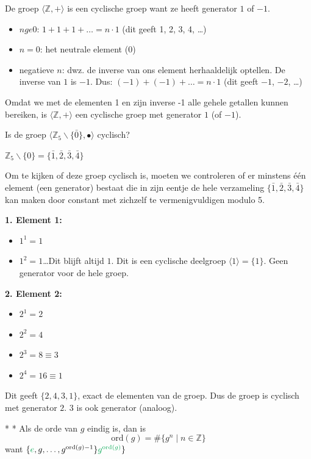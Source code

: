 \textbf{} De groep $\langle \mathbb{Z},+ \rangle$ is een cyclische groep want ze heeft generator $1$ of $-1$.
\begin{itemize}
    \item $n ge 0$: $1+1+1+ \dots = n \cdot 1$ (dit geeft 1, 2, 3, 4, \dots)
    \item $n=0$: het neutrale element (0)
    \item negatieve $n$: dwz. de inverse van ons element herhaaldelijk optellen. De inverse van $1$ is $-1$. Dus: $(-1) + (-1) + \dots = n \cdot 1$ (dit geeft $-1$, $-2$, \dots)
\end{itemize}
Omdat we met de elementen 1 en zijn inverse -1 alle gehele getallen kunnen bereiken, is $\langle \mathbb{Z},+ \rangle$ een cyclische groep met generator $1$ (of $-1$).

\begin{niceexercise}
    Is de groep $\langle \mathbb{Z}_5 \backslash \{\bar{0}\}, \bullet \rangle$ cyclisch?
\end{niceexercise}

\textbf{} $\mathbb{Z}_5 \backslash \{0\} = \{\bar{1}, \bar{2}, \bar{3}, \bar{4}\}$

Om te kijken of deze groep cyclisch is, moeten we controleren of er minstens één element (een generator) bestaat die in zijn eentje de hele verzameling $\{\bar{1}, \bar{2}, \bar{3}, \bar{4}\}$ kan maken door constant met zichzelf te vermenigvuldigen modulo 5.

\textbf{1. Element 1:}
\begin{itemize}
    \item $1^1 = 1$
    \item $1^2 = 1$\dots Dit blijft altijd $1$. Dit is een cyclische deelgroep $\langle 1 \rangle = \{1\}$. Geen generator voor de hele groep.
\end{itemize}
\textbf{2. Element 2:}
\begin{itemize}
    \item $2^1=2$
    \item $2^2=4$
    \item $2^3=8\equiv3$
    \item $2^4=16\equiv1$
\end{itemize}
Dit geeft $\{2, 4, 3, 1\}$, exact de elementen van de groep. Dus de groep is cyclisch met generator $2$. $3$ is ook generator (analoog).

\begin{nicenote}*
    \nextpart[]*
    Als de orde van $g$ eindig is, dan is
    \begin{equation*}
        \text{ord}(g) = \#\{g^n \mid n \in \mathbb{Z}\}
    \end{equation*}
    want $\{\textcolor{Green}{e}, g, \dots, g^{\text{ord}(g)-1}\}\textcolor{Green}{g^{\text{ord}(g)}}\}$
\end{nicenote}

